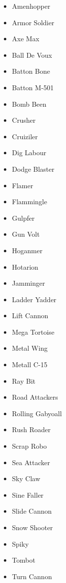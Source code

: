 \begin{itemize}
	\item \hypertarget{enem:Amenhopper}{Amenhopper}
	\item \hypertarget{enem:Armor_Soldier}{Armor Soldier}
	\item \hypertarget{enem:Axe_Max}{Axe Max}
	\item \hypertarget{enem:Ball_De_Voux}{Ball De Voux}
	\item \hypertarget{enem:Batton_Bone}{Batton Bone}
	\item \hypertarget{enem:Batton_M-501}{Batton M-501} 
	\item \hypertarget{enem:Bomb_Been}{Bomb Been}
	\item \hypertarget{enem:Crusher}{Crusher}
	\item \hypertarget{enem:Cruiziler}{Cruiziler}
	\item \hypertarget{enem:Dig_Labour}{Dig Labour}
	\item \hypertarget{enem:Dodge_Blaster}{Dodge Blaster}
	\item \hypertarget{enem:Flamer}{Flamer} 
	\item \hypertarget{enem:Flammingle}{Flammingle}
	\item \hypertarget{enem:Gulpfer}{Gulpfer}
	\item \hypertarget{enem:Gun_Volt}{Gun Volt}
	\item \hypertarget{enem:Hoganmer}{Hoganmer}
	\item \hypertarget{enem:Hotarion}{Hotarion}
	\item \hypertarget{enem:Jamminger}{Jamminger}
	\item \hypertarget{enem:Ladder_Yadder}{Ladder Yadder}
	\item \hypertarget{enem:Lift Cannon}{Lift Cannon}
	\item \hypertarget{enem:Mega_Tortoise}{Mega Tortoise}
	\item \hypertarget{enem:Metal_Wing}{Metal Wing}
	\item \hypertarget{enem:Metall_C-15}{Metall C-15} 
	\item \hypertarget{enem:Ray_Bit}{Ray Bit}
	\item \hypertarget{enem:Road_Attackers}{Road Attackers}
	\item \hypertarget{enem:Rolling_Gabyoall}{Rolling Gabyoall}
	\item \hypertarget{enem:Rush_Roader}{Rush Roader}
	\item \hypertarget{enem:Scrap_Robo}{Scrap Robo}
	\item \hypertarget{enem:Sea_Attacker}{Sea Attacker}
	\item \hypertarget{enem:Sky_Claw}{Sky Claw}
	\item \hypertarget{enem:Sine_Faller}{Sine Faller}
	\item \hypertarget{enem:Slide_Cannon}{Slide Cannon}
	\item \hypertarget{enem:Snow_Shooter}{Snow Shooter}
	\item \hypertarget{enem:Spiky}{Spiky}
	\item \hypertarget{enem:Tombot}{Tombot}
	\item \hypertarget{enem:Turn_Cannon}{Turn Cannon}

\end{itemize}










